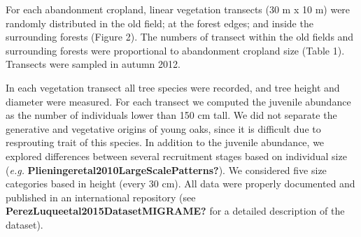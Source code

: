 \documentclass[
]{article}
\begin{document}
For each abandonment cropland, linear vegetation transects (30 m x 10 m)
were randomly distributed in the old field; at the forest edges; and
inside the surrounding forests (Figure 2). The numbers of transect
within the old fields and surrounding forests were proportional to
abandonment cropland size (Table 1). Transects were sampled in autumn
2012.

\begin{table}

\caption{\label{tab:croplands}Abandonment cropland features}
\centering
{}
\end{table}

In each vegetation transect all tree species were recorded, and tree
height and diameter were measured. For each transect we computed the
juvenile abundance as the number of individuals lower than 150 cm tall.
We did not separate the generative and vegetative origins of young oaks,
since it is difficult due to resprouting trait of this species. In
addition to the juvenile abundance, we explored differences between
several recruitment stages based on individual size (\emph{e.g.}
\textbf{Plieningeretal2010LargeScalePatterns?}). We considered five size
categories based in height (every 30 cm). All data were properly
documented and published in an international repository (see
\textbf{PerezLuqueetal2015DatasetMIGRAME?} for a detailed description of
the dataset).
\end{document}
